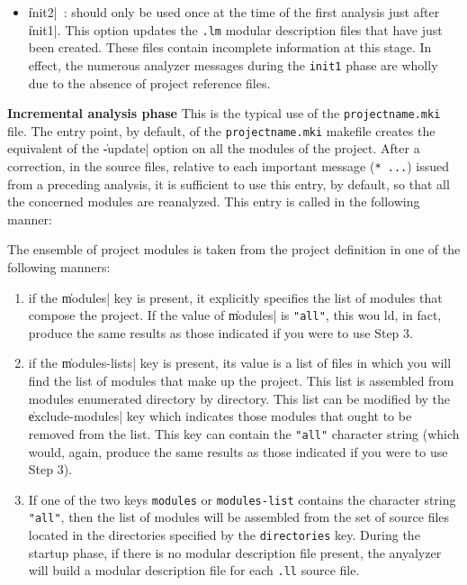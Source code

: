 \begin{itemize}
\begin{itemize}
\item \|init2| \,:  should only be used once at the time of the first analysis just after \|init1|. 
This option updates the {\tt *.lm} modular description files that have just been created.  These files contain incomplete information at this stage.  In effect, the numerous analyzer messages during the {\tt init1} phase are wholly due to the absence of project reference files.
\end{itemize}

\begin{Side}{\bf Incremental analysis phase}
This is the typical use of the {\tt projectname.mki} file.
The entry point, by default, of the {\tt projectname.mki} makefile creates the equivalent of the \|-update| option on all the modules of the project.  After a correction, in the source files, relative to each important message ({\tt ** ...}) issued from a preceding analysis, it is sufficient to use this entry, by default, so that all the concerned modules are reanalyzed.  
This entry is called in the following manner:
\BeginLL
\EndLL
\end{Side}

The ensemble of project modules is taken from the project definition in one of the following manners: 
\begin{enumerate}
\item if the \|modules| key is present, it explicitly specifies the list of modules that compose the project.  If the value of \|modules| is {\tt "all"}, this wou
ld, in fact, produce the same results as those indicated if you were to use Step
 3.
\item if the \|modules-lists| key is present, its value is a list of files in which you will find the list of modules that make up the project.  This list is assembled from modules enumerated directory by directory. This list can be 
modified by the \|exclude-modules| key which indicates those modules that 
ought to be removed from the list.  
This key can contain the {\tt "all"} character string (which would, again, produce the same results as those indicated if you were to use Step 3).

\item If one of the two keys {\tt modules} or {\tt modules-list} contains
the character string {\tt "all"}, then the list of modules will be assembled
from the set of source files located in the directories specified by the 
{\tt directories} key.  During the startup phase, if there is no modular
description file present, the anyalyzer will build a modular description file
for each {\tt *.ll} source file.
\end{enumerate}


\end{itemize}

